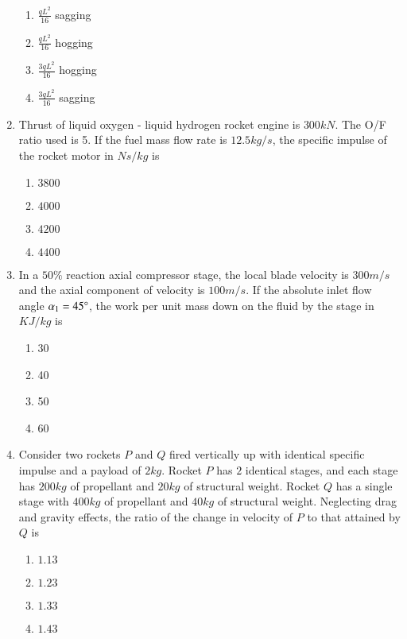 \documentclass[journal,12pt,onecolumn]{IEEEtran}
\theoremstyle{remark}
\begin{document}
\begin{enumerate}[start=40]
\begin{center}
\end{center}
\begin{enumerate}
	\item $\frac{qL^2}{16}$ sagging
	\item $\frac{qL^2}{16}$ hogging
	\item $\frac{3qL^2}{16}$ hogging
	\item $\frac{3qL^2}{16}$ sagging
\end{enumerate}
\item Thrust of liquid oxygen - liquid hydrogen rocket engine is $300 kN$. The O/F ratio used is 5. If the fuel mass flow rate is $12.5 kg/s$, the specific impulse of the rocket motor in $Ns/kg$ is
	\begin{enumerate}
		\item $3800$
		\item $4000$
		\item $4200$
		\item $4400$
	\end{enumerate}
\item In a $50\%$ reaction axial compressor stage, the local blade velocity is $300 m/s$ and the axial component of velocity is $100 m/s$. If the absolute inlet flow angle $\alpha _1=45\degree$, the work per unit mass down on the fluid by the stage in $KJ/kg$ is
	\begin{enumerate}
	\item 30 \item 40 \item 50 \item 60
	\end{enumerate}
\item Consider two rockets $P$ and $Q$ fired vertically up with identical specific impulse and a payload of $2 kg$. Rocket $P$ has $2$ identical stages, and each stage has $200 kg$ of propellant and $20 kg$ of structural weight. Rocket $Q$ has a single stage with $400 kg$ of propellant and $40 kg$ of structural weight. Neglecting drag and gravity effects, the ratio of the change in velocity of $P$ to that attained by $Q$ is 
	\begin{enumerate}
\item $1.13$ \item $1.23$ \item $1.33$ \item $1.43$
	\end{enumerate}

\end{enumerate}
\end{document}
